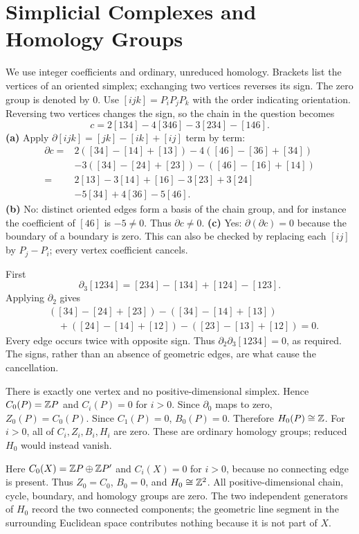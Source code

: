 \section{Simplicial Complexes and Homology Groups}
We use integer coefficients and ordinary, unreduced homology. Brackets list the vertices of an oriented simplex; exchanging two vertices reverses its sign. The zero group is denoted by $0$.
Use $[ijk]=P_iP_jP_k$ with the order indicating orientation. Reversing two vertices changes the sign, so the chain in the question becomes
\[
c=2[134]-4[346]-3[234]-[146].
\]
\textbf{(a)} Apply $\partial[ijk]=[jk]-[ik]+[ij]$ term by term:
\[
\begin{aligned}
\partial c={}&2([34]-[14]+[13])
-4([46]-[36]+[34])\\
&-3([34]-[24]+[23])
-([46]-[16]+[14])\\
={}&2[13]-3[14]+[16]-3[23]+3[24]\\
&-5[34]+4[36]-5[46].
\end{aligned}
\]
\textbf{(b)} No: distinct oriented edges form a basis of the chain group, and for instance the coefficient of $[46]$ is $-5\ne0$. Thus $\partial c\ne0$.
\textbf{(c)} Yes: $\partial(\partial c)=0$ because the boundary of a boundary is zero. This can also be checked by replacing each $[ij]$ by $P_j-P_i$; every vertex coefficient cancels.

First
\[
\partial_3[1234]=[234]-[134]+[124]-[123].
\]
Applying $\partial_2$ gives
\[
\begin{aligned}
&([34]-[24]+[23])-([34]-[14]+[13])\\
&\quad+([24]-[14]+[12])-([23]-[13]+[12])=0.
\end{aligned}
\]
Every edge occurs twice with opposite sign. Thus $\partial_2\partial_3[1234]=0$, as required. The signs, rather than an absence of geometric edges, are what cause the cancellation.

There is exactly one vertex and no positive-dimensional simplex. Hence $C_0(P)=\mathbb{Z} P$ and $C_i(P)=0$ for $i>0$.
Since $\partial_0$ maps to zero, $Z_0(P)=C_0(P)$. Since $C_1(P)=0$, $B_0(P)=0$.
Therefore $H_0(P)\cong\mathbb{Z}$. For $i>0$, all of $C_i,Z_i,B_i,H_i$ are zero. These are ordinary homology groups; reduced $H_0$ would instead vanish.

Here $C_0(X)=\mathbb{Z} P\oplus\mathbb{Z} P'$ and $C_i(X)=0$ for $i>0$, because no connecting edge is present. Thus $Z_0=C_0$, $B_0=0$, and $H_0\cong\mathbb{Z}^2$.
All positive-dimensional chain, cycle, boundary, and homology groups are zero. The two independent generators of $H_0$ record the two connected components; the geometric line segment in the surrounding Euclidean space contributes nothing because it is not part of $X$.

